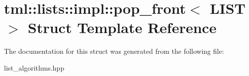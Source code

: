 \hypertarget{structtml_1_1lists_1_1impl_1_1pop__front}{\section{tml\+:\+:lists\+:\+:impl\+:\+:pop\+\_\+front$<$ L\+I\+S\+T $>$ Struct Template Reference}
\label{structtml_1_1lists_1_1impl_1_1pop__front}
}


The documentation for this struct was generated from the following file\+:\begin{DoxyCompactItemize}
\item 
list\+\_\+algorithms.\+hpp\end{DoxyCompactItemize}
